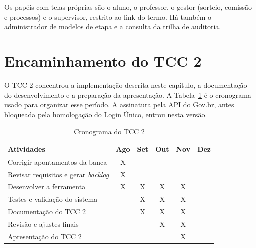 Os papéis com telas próprias são o aluno, o professor, o gestor (sorteio, comissão e processos) e o supervisor, restrito ao link do termo. Há também o administrador de modelos de etapa e a consulta da trilha de auditoria.

\section{Encaminhamento do TCC 2}

O TCC 2 concentrou a implementação descrita neste capítulo, a documentação do desenvolvimento e a preparação da apresentação. A Tabela~\ref{tab:cronograma-tcc2} é o cronograma usado para organizar esse período. A assinatura pela API do Gov.br, antes bloqueada pela homologação do Login Único, entrou nesta versão.

\begin{table}[H]
\centering
\caption{Cronograma do TCC 2}
\label{tab:cronograma-tcc2}
\begin{tabular}{|l|c|c|c|c|c|}
\hline
\textbf{Atividades} & \textbf{Ago} & \textbf{Set} & \textbf{Out} & \textbf{Nov} & \textbf{Dez} \\
\hline
Corrigir apontamentos da banca & X & & & & \\
\hline
Revisar requisitos e gerar \textit{backlog} & X & & & & \\
\hline
Desenvolver a ferramenta & X & X & X & X &  \\
\hline
Testes e validação do sistema & & X & X & X & \\
\hline
Documentação do TCC 2 & & X & X & X &  \\
\hline
Revisão e ajustes finais & & & X & X & \\
\hline
Apresentação do TCC 2 & & & & X &  \\
\hline
\end{tabular}
\end{table}
